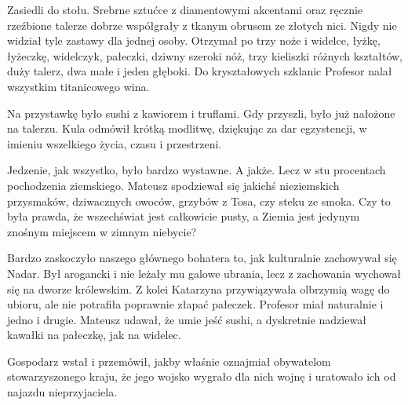 \divider{}

Zasiedli do stołu. Srebrne sztućce z diamentowymi akcentami oraz ręcznie rzeźbione talerze dobrze współgrały z tkanym obrusem ze złotych nici.
Nigdy nie widział tyle zastawy dla jednej osoby. 
Otrzymał po trzy noże i widelce, łyżkę, łyżeczkę, widelczyk, pałeczki, dziwny szeroki nóż, trzy kieliszki różnych kształtów, duży talerz, dwa małe i jeden głęboki.
Do kryształowych szklanic Profesor nalał wszystkim titanicowego wina.

Na przystawkę było sushi z kawiorem i truflami. Gdy przyszli, było już nałożone na talerzu. 
Kula odmówił krótką modlitwę, dziękując za dar egzystencji, w imieniu wszelkiego życia, czasu i przestrzeni.

Jedzenie, jak wszystko, było bardzo wystawne. A jakże. Lecz w stu procentach pochodzenia ziemskiego.
Mateusz spodziewał się jakichś nieziemskich przysmaków, dziwacznych owoców, grzybów z Tosa, czy steku ze smoka.
Czy to była prawda, że wszechświat jest całkowicie pusty, a Ziemia jest jedynym znośnym miejscem w zimnym niebycie?

Bardzo zaskoczyło naszego głównego bohatera to, jak kulturalnie zachowywał się Nadar. 
Był arogancki i nie leżały mu galowe ubrania, lecz z zachowania wychował się na dworze królewskim.
Z kolei Katarzyna przywiązywała olbrzymią wagę do ubioru, ale nie potrafiła poprawnie złapać pałeczek.
Profesor miał naturalnie i jedno i drugie.
Mateusz udawał, że umie jeść sushi, a dyskretnie nadziewał kawałki na pałeczkę, jak na widelec.

Gospodarz wstał i przemówił, jakby właśnie oznajmiał obywatelom stowarzyszonego kraju, że jego wojsko wygrało dla nich wojnę i uratowało ich od najazdu nieprzyjaciela.


